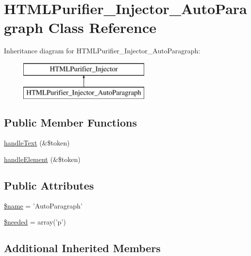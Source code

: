 \hypertarget{classHTMLPurifier__Injector__AutoParagraph}{\section{H\+T\+M\+L\+Purifier\+\_\+\+Injector\+\_\+\+Auto\+Paragraph Class Reference}
\label{classHTMLPurifier__Injector__AutoParagraph}
}
Inheritance diagram for H\+T\+M\+L\+Purifier\+\_\+\+Injector\+\_\+\+Auto\+Paragraph\+:\begin{figure}[H]
\begin{center}
\leavevmode
\includegraphics[height=2.000000cm]{classHTMLPurifier__Injector__AutoParagraph}
\end{center}
\end{figure}
\subsection*{Public Member Functions}
\begin{DoxyCompactItemize}
\item 
\hyperlink{classHTMLPurifier__Injector__AutoParagraph_ac7b240e8e0e9a374b087f5c5f7f30070}{handle\+Text} (\&\$token)
\item 
\hyperlink{classHTMLPurifier__Injector__AutoParagraph_aac5e6c7ac17a2a6e659ebc8e3dfc7533}{handle\+Element} (\&\$token)
\end{DoxyCompactItemize}
\subsection*{Public Attributes}
\begin{DoxyCompactItemize}
\item 
\hyperlink{classHTMLPurifier__Injector__AutoParagraph_a003bc6d4f2f794a6ca7f5288a751c260}{\$name} = 'Auto\+Paragraph'
\item 
\hyperlink{classHTMLPurifier__Injector__AutoParagraph_a3acffb72b8e8141e174efeff7dd2f5d2}{\$needed} = array('p')
\end{DoxyCompactItemize}
\subsection*{Additional Inherited Members}


